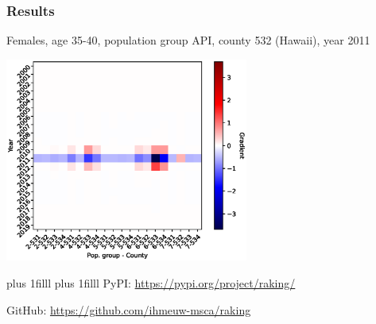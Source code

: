 \documentclass[aspectratio=169]{beamer}
\newcommand{\btVFill}{\vskip0pt plus 1filll}
\begin{document}
\begin{frame}
	\frametitle{Results}
	\centering
	Females, age 35-40, population group API, county 532 (Hawaii), year 2011

	\vspace{1em}

	\includegraphics[width=8cm]{gradient_2_35_7_532_2011.eps}
\end{frame}

\begin{frame}
\btVFill
{}
\btVFill
PyPI: \href{https://pypi.org/project/raking/}{https://pypi.org/project/raking/}

GitHub: \href{https://github.com/ihmeuw-msca/raking}{https://github.com/ihmeuw-msca/raking}
\end{frame}
\end{document}
